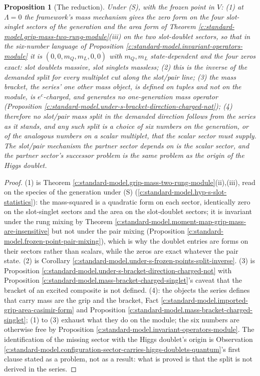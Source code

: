 \documentclass[11pt]{article}
\newtheorem{proposition}[theorem]{Proposition}
\theoremstyle{definition}
\theoremstyle{plain}
\newcommand{\changedmark}[2]{\marginpar{\raggedright\scriptsize\color{#1}#2}}
\begin{document}
\begin{proposition}[The reduction]\label{c:standard-model.reduction}
\changedmark{gray}{reworded}
Under (S), with the frozen point in $V$: (1) at $\Lambda = 0$ the framework's mass mechanism gives the zero form on the four slot-singlet sectors of the generation and the area form of Theorem \ref{c:standard-model.grip-mass-two-rung-module}(iii) on the two slot-doublet sectors, so that in the six-number language of Proposition \ref{c:standard-model.invariant-operators-module} it is $(0, 0, m_{Q}, m_{L}, 0, 0)$ with $m_{Q}, m_{L}$ state-dependent and the four zeros exact: slot doublets massive, slot singlets massless; (2) this is the inverse of the demanded split for every multiplet cut along the slot/pair line; (3) the mass bracket, the series' one other mass object, is defined on tuples and not on the module, is $e^{c}$-charged, and generates no one-generation mass operator (Proposition \ref{c:standard-model.under-s-bracket-direction-charged-not}); (4) therefore no slot/pair mass split in the demanded direction follows from the series as it stands, and any such split is a choice of six numbers on the generation, or of the analogous numbers on a scalar multiplet, that the scalar sector must supply. The slot/pair mechanism the partner sector depends on is the scalar sector, and the partner sector's successor problem is the same problem as the origin of the Higgs doublet.
\end{proposition}
\begin{proof}
(1) is Theorem \ref{c:standard-model.grip-mass-two-rung-module}(ii),(iii), read on the species of the generation under (S) (\ref{c:standard-model.hyp-s-slot-statistics}): the mass-squared is a quadratic form on each sector, identically zero on the slot-singlet sectors and the area on the slot-doublet sectors; it is invariant under the rung mixing by Theorem \ref{c:standard-model.moment-map-grip-mass-are-insensitive} but not under the pair mixing (Proposition \ref{c:standard-model.frozen-point-pair-mixing}), which is why the doublet entries are forms on their sectors rather than scalars, while the zeros are exact whatever the pair state. (2) is Corollary \ref{c:standard-model.under-s-frozen-points-split-inverse}. (3) is Proposition \ref{c:standard-model.under-s-bracket-direction-charged-not} with Proposition \ref{c:standard-model.mass-bracket-charged-singlet}'s caveat that the bracket of an excited composite is not defined. (4): the objects the series defines that carry mass are the grip and the bracket, Fact \ref{c:standard-model.imported-grip-area-casimir-form} and Proposition \ref{c:standard-model.mass-bracket-charged-singlet}; (1) to (3) exhaust what they do on the module; the six numbers are otherwise free by Proposition \ref{c:standard-model.invariant-operators-module}. The identification of the missing sector with the Higgs doublet's origin is Observation \ref{c:standard-model.configuration-sector-carries-higgs-doublets-quantum}'s first clause stated as a problem, not as a result: what is proved is that the split is not derived in the series.

\end{proof}
\end{document}

